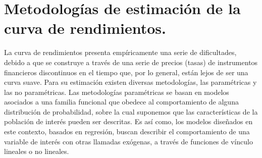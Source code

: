 % 
% 
% 
% 
% 
% 
% 
% 
% 
% 
% 
% 
% 

\section{Metodolog\'ias de estimaci\'on de la curva de rendimientos.}

\hspace*{0.4 cm} La curva de rendimientos presenta emp\'iricamente una serie de dificultades, debido a que se construye a trav\'es de una serie de precios (tasas) de instrumentos financieros discontinuos en el tiempo que, por lo general, est\'an lejos de ser una curva suave. Para su estimaci\'on existen diversas metodolog\'ias, las param\'etricas y las no param\'etricas. Las metodolog\'ias param\'etricas se basan en modelos asociados a una familia funcional que obedece al comportamiento de alguna distribuci\'on de probabilidad, sobre la cual suponemos que las caracter\'isticas de la poblaci\'on de inter\'es pueden ser descritas. Es as\'i como, los modelos dise\~nados en este contexto, basados en regresi\'on, buscan describir el comportamiento de una variable de inter\'es con otras llamadas ex\'ogenas, a trav\'es de funciones de v\'inculo lineales o no lineales.


